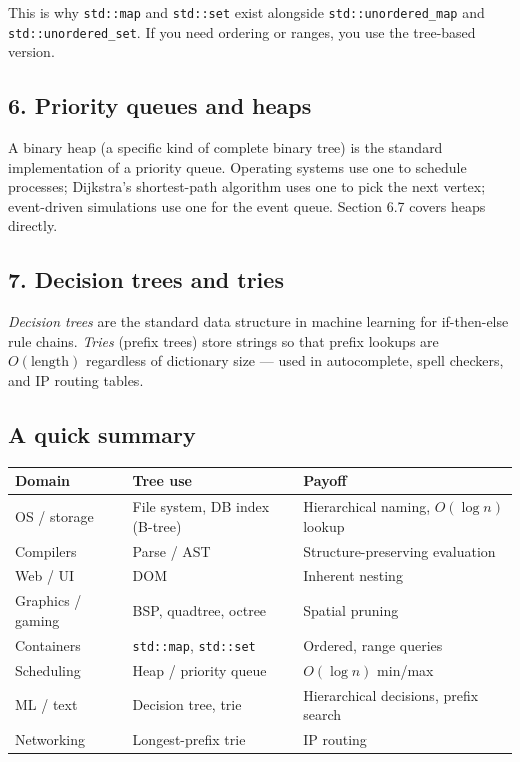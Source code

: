 \documentclass[11pt]{article}
\begin{document}
This is why \texttt{std::map} and \texttt{std::set} exist
alongside \texttt{std::unordered\_map} and
\texttt{std::unordered\_set}. If you need ordering or ranges,
you use the tree-based version.

\subsection*{6. Priority queues and heaps}

A binary heap (a specific kind of complete binary tree) is the
standard implementation of a priority queue. Operating systems
use one to schedule processes; Dijkstra's shortest-path algorithm
uses one to pick the next vertex; event-driven simulations use
one for the event queue. Section 6.7 covers heaps directly.

\subsection*{7. Decision trees and tries}

\emph{Decision trees} are the standard data structure in machine
learning for if-then-else rule chains. \emph{Tries} (prefix
trees) store strings so that prefix lookups are $O(\text{length})$
regardless of dictionary size --- used in autocomplete, spell
checkers, and IP routing tables.

\subsection*{A quick summary}

\begin{center}
\begin{tabular}{|l|l|l|}
\hline
\textbf{Domain} & \textbf{Tree use} & \textbf{Payoff} \\
\hline
OS / storage        & File system, DB index (B-tree) & Hierarchical naming, $O(\log n)$ lookup \\
Compilers           & Parse / AST                   & Structure-preserving evaluation \\
Web / UI            & DOM                            & Inherent nesting \\
Graphics / gaming   & BSP, quadtree, octree          & Spatial pruning \\
Containers          & \texttt{std::map}, \texttt{std::set} & Ordered, range queries \\
Scheduling          & Heap / priority queue          & $O(\log n)$ min/max \\
ML / text           & Decision tree, trie            & Hierarchical decisions, prefix search \\
Networking          & Longest-prefix trie            & IP routing \\
\hline
\end{tabular}
\end{center}
\end{document}

